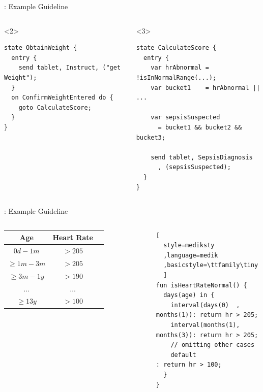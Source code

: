 \documentclass{beamer}
\begin{document}
\begin{frame}[fragile]{\MediK{}: Example Guideline}
  \begin{columns}
      
    \begin{onlyenv}<2>
      \begin{lstlisting}[language=medik, style=mediksty, basicstyle=\ttfamily\tiny]
state ObtainWeight {
  entry {
    send tablet, Instruct, ("get Weight");
  }
  on ConfirmWeightEntered do {
    goto CalculateScore;
  }
}
    \end{lstlisting}
    \end{onlyenv}
    \begin{onlyenv}<3>
      \begin{lstlisting}[language=medik, style=mediksty, basicstyle=\ttfamily\tiny]
state CalculateScore {
  entry {
    var hrAbnormal = !isInNormalRange(...);
    var bucket1    = hrAbnormal || ...

    var sepsisSuspected
      = bucket1 && bucket2 && bucket3;

    send tablet, SepsisDiagnosis
      , (sepsisSuspected);
  }
}
      \end{lstlisting}
    \end{onlyenv}
  \end{columns}
\end{frame}

\begin{frame}[fragile]{\MediK{}: Example Guideline}
  \begin{columns}
    \tiny
    \begin{tabular}{ | c || c | c | }
      \hline
      \textbf{Age}            & \textbf{Heart Rate} \\
      \hline
      $0d - 1m$               & $>205$              \\
      \hline
      $\geq 1m - 3m$          & $>205$              \\
      \hline
      $\geq 3m - 1y$          & $>190$              \\
      \hline
      $\dots$                 & $\dots$             \\
      \hline
      $\geq 13y$              & $>100$              \\
      \hline
    \end{tabular}
\begin{lstlisting}[
  style=mediksty
  ,language=medik
  ,basicstyle=\ttfamily\tiny
  ]
fun isHeartRateNormal() {
  days(age) in {
    interval(days(0)  , months(1)): return hr > 205;
    interval(months(1), months(3)): return hr > 205;
    // omitting other cases
    default                       : return hr > 100;
  }
}
\end{lstlisting}
  \end{columns}
\end{frame}
\end{document}
